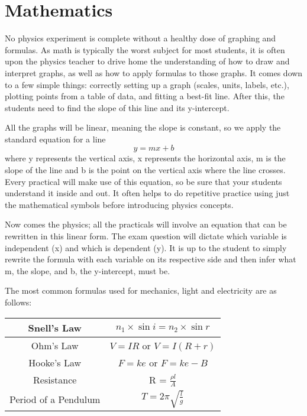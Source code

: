 \section{Mathematics}

No physics experiment is complete without a healthy dose of graphing and
formulas. As math is typically the worst subject for most students, it is often upon the
physics teacher to drive home the understanding of how to draw and interpret graphs, as
well as how to apply formulas to those graphs. It comes down to a few simple things:
correctly setting up a graph (scales, units, labels, etc.), plotting points from a table of
data, and fitting a best-fit line. After this, the students need to find the slope of this line
and its y-intercept.

All the graphs will be linear, meaning the slope is constant, so we apply the standard
equation for a line
$$y=mx + b$$
where y represents the vertical axis, x represents the horizontal axis, m is the slope of the line and b is the point on the vertical axis where the line crosses. Every practical will make use of this equation, so be sure that your students understand it inside and out. It often helps to do repetitive practice using just the mathematical symbols before introducing physics concepts.

Now comes the physics; all the practicals will involve an equation that can be
rewritten in this linear form. The exam question will dictate which variable is
independent (x) and which is dependent (y). It is up to the student to simply rewrite the
formula with each variable on its respective side and then infer what m, the slope, and b,
the y-intercept, must be.

The most common formulas used for mechanics, light and electricity are as follows:

\begin{center}
\begin{tabular}{ | c | c | }
\hline
Snell's Law & $n_1 \times \sin{i} = n_2 \times \sin{r}$ \\ \hline
Ohm's Law & $V=IR$ or $V = I(R + r)$\\ \hline
Hooke's Law & $ F = ke $ or $ F = ke - B $ \\ \hline
Resistance & R = $\frac{\rho l}{A}$ \\ \hline
Period of a Pendulum & $T = 2\pi\sqrt{\frac{l}{g}}$ \\ \hline
\end{tabular}
\end{center}

